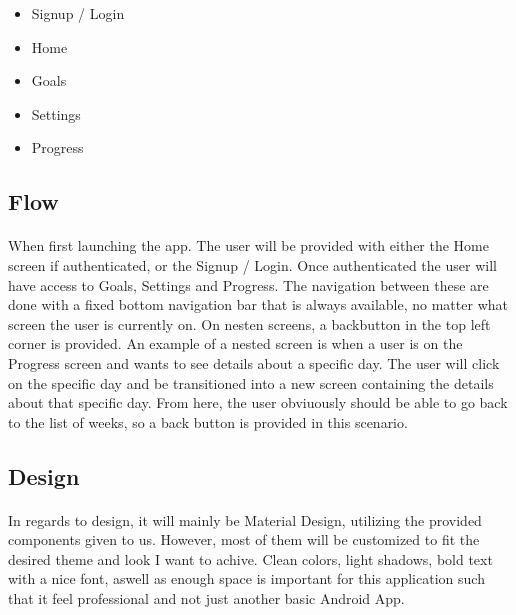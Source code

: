 \documentclass{article}
\begin{document}
        \hfill \break

        \begin{itemize}
            \item Signup / Login
            \item Home
            \item Goals
            \item Settings
            \item Progress
        \end{itemize}

        \hfill \break

        \subsection{Flow}
            \paragraph{}
            When first launching the app. The user will be provided with either the Home screen if authenticated, or the Signup / Login.
            Once authenticated the user will have access to Goals, Settings and Progress. The navigation between these are done with a fixed
            bottom navigation bar that is always available, no matter what screen the user is currently on. On nesten screens, a backbutton in the top left corner
            is provided. An example of a nested screen is when a user is on the Progress screen and wants to see details about a specific day. 
            The user will click on the specific day and be transitioned into a new screen containing the details about that specific day. From here,
            the user obviuously should be able to go back to the list of weeks, so a back button is provided in this scenario.

        \hfill \break

        \subsection{Design}
            \paragraph{}
            In regards to design, it will mainly be Material Design, utilizing the provided components given to us. 
            However, most of them will be customized to fit the desired theme and look I want to achive. 
            Clean colors, light shadows, bold text with a nice font, aswell as enough space is important for this application
            such that it feel professional and not just another basic Android App.  
\end{document}
